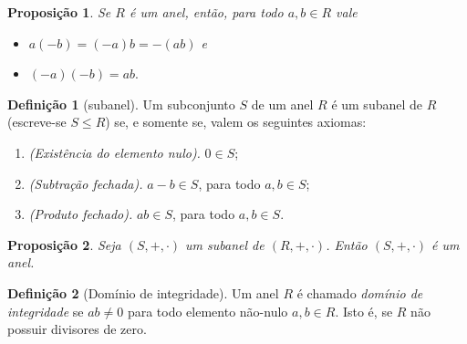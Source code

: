 \documentclass[a4paper,12pt]{report}
\theoremstyle{plain}
\newtheorem{proposicao}{Proposição}[section]
\theoremstyle{definition}
\newtheorem{definicao}{Definição}[section]
\begin{document}
	\begin{proposicao}
		Se $R$ é um anel, então, para todo $a,b\in R$ vale
		\begin{itemize}
			\item $a(-b) = (-a)b = -(ab)$ e
			\item $(-a)(-b) = ab.$
		\end{itemize}
	\end{proposicao}
	
	
	\begin{definicao}[subanel]
		Um subconjunto $S$ de um anel $R$ é um subanel de $R$ (escreve-se $S\leq R$) se, e somente se, valem os seguintes axiomas:
		\begin{enumerate}
			\item \emph{(Existência do elemento nulo).} $0 \in S$;
			\item \emph{(Subtração fechada).} $a-b \in S$, para todo $a,b\in S$;
			\item \emph{(Produto fechado).} $ab\in S$, para todo $a,b\in S$.
		\end{enumerate}
	\end{definicao}
	
	\begin{proposicao}
		Seja $(S,+, \cdot)$ um subanel de $(R,+, \cdot)$. Então $(S,+, \cdot)$ é um anel.	
	\end{proposicao}
	
	
	\begin{definicao}[Domínio de integridade]
		Um anel $R$ é chamado \emph{domínio de integridade} se $ab \neq 0$ para todo elemento não-nulo $a,b \in R$. Isto é, se $R$ não possuir divisores de zero.
	\end{definicao}
	
	
\end{document}
